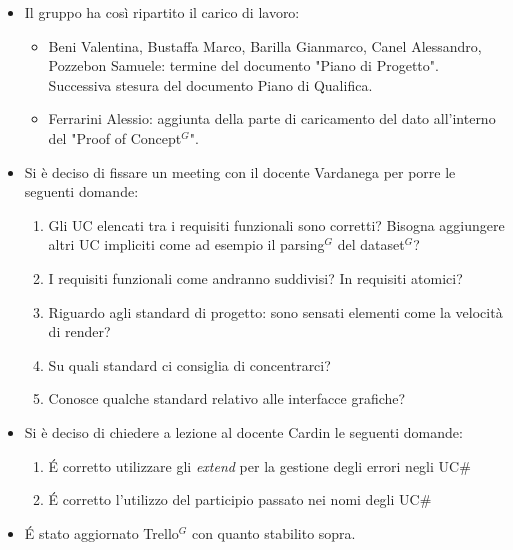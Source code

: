 \begin{itemize}
	\item Il gruppo ha così ripartito il carico di lavoro:
	\begin{itemize}
		\item Beni Valentina, Bustaffa Marco, Barilla Gianmarco, Canel Alessandro, Pozzebon Samuele: termine del documento "Piano di Progetto". Successiva stesura del documento Piano di Qualifica. 
		\item Ferrarini Alessio: aggiunta della parte di caricamento del dato all'interno del "Proof of Concept$^{G}$".
	\end{itemize}
	\item Si è deciso di fissare un meeting con il docente Vardanega per porre le seguenti domande:
	\begin{enumerate}
		\item Gli UC elencati tra i requisiti funzionali sono corretti? Bisogna aggiungere altri UC impliciti come ad esempio il parsing$^{G}$ del dataset$^{G}$?
		\item I requisiti funzionali come andranno suddivisi? In requisiti atomici?
		\item Riguardo agli standard di progetto: sono sensati elementi come la velocità di render?
		\item Su quali standard ci consiglia di concentrarci?
		\item Conosce qualche standard relativo alle interfacce grafiche?
	\end{enumerate}
	\item Si è deciso di chiedere a lezione al docente Cardin le seguenti domande:
	\begin{enumerate}
		\item \' E corretto utilizzare gli \textit{extend} per la gestione degli errori negli UC\#
		\item \' E corretto l'utilizzo del participio passato nei nomi degli UC\#
	\end{enumerate}
	\item \' E stato aggiornato Trello$^{G}$ con quanto stabilito sopra.
\end{itemize}